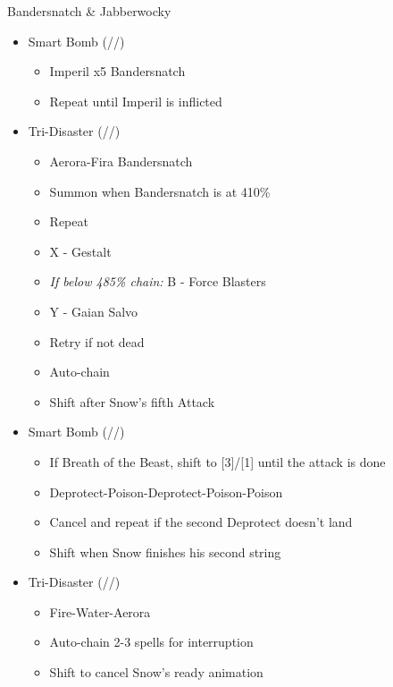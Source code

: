 \begin{multicols}{2}
  \renewcommand{\second}{[2] Devastation (\sab/\com/\com)}
  \renewcommand{\fifth}{[5] Smart Bomb (\sab/\rav/\rav)}
  \renewcommand{\sixth}{[6] Tri-Disaster (\rav/\rav/\rav)}
  \begin{battle}{Bandersnatch \& Jabberwocky}
    \begin{itemize}
      \item \fifth
            \begin{itemize}
              \item Imperil x5 Bandersnatch
              \item Repeat until Imperil is inflicted
            \end{itemize}
      \item \sixth
            \begin{itemize}
              \item Aerora-Fira Bandersnatch
              \item Summon when Bandersnatch is at 410\%
              \item Repeat
              \item X - Gestalt
              \item {\it If below 485\% chain:} B - Force Blasters
              \item Y - Gaian Salvo
              \item Retry if not dead
              \item Auto-chain
              \item Shift after Snow's fifth Attack
            \end{itemize}
      \item \fifth
            \begin{itemize}
              \item If Breath of the Beast, shift to [3]/[1] until the attack is done
              \item Deprotect-Poison-Deprotect-Poison-Poison
              \item Cancel and repeat if the second Deprotect doesn't land
              \item Shift when Snow finishes his second string
            \end{itemize}
      \item \sixth
            \begin{itemize}
              \item Fire-Water-Aerora
              \item Auto-chain 2-3 spells for interruption
              \item Shift to cancel Snow's ready animation

\end{itemize}
\end{itemize}
\end{battle}
\end{multicols}
